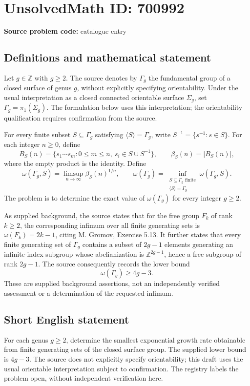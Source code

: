 \documentclass[11pt]{article}
\newcommand{\Z}{\mathbb{Z}}
\begin{document}
\section*{UnsolvedMath ID: 700992}
\textbf{Source problem code:} catalogue entry
\subsection{Definitions and mathematical statement}
Let \(g\in\Z\) with \(g\geq 2\). The source denotes by \(\Gamma_g\) the fundamental group of a closed surface of genus \(g\), without explicitly specifying orientability. Under the usual interpretation as a closed connected orientable surface \(\Sigma_g\), set \(\Gamma_g=\pi_1(\Sigma_g)\). The formulation below uses this interpretation; the orientability qualification requires confirmation from the source.

For every finite subset \(S\subseteq\Gamma_g\) satisfying \(\langle S\rangle=\Gamma_g\), write \(S^{-1}=\{s^{-1}:s\in S\}\). For each integer \(n\geq 0\), define
\[
 B_S(n)=\{s_1\cdots s_m:0\leq m\leq n,\ s_i\in S\cup S^{-1}\},
 \qquad \beta_S(n)=|B_S(n)|,
\]
where the empty product is the identity. Define
\[
 \omega(\Gamma_g,S)=\limsup_{n\to\infty}\beta_S(n)^{1/n},
 \qquad
 \omega(\Gamma_g)=\inf_{\substack{S\subseteq\Gamma_g\text{ finite}\\\langle S\rangle=\Gamma_g}}\omega(\Gamma_g,S).
\]
The problem is to determine the exact value of \(\omega(\Gamma_g)\) for every integer \(g\geq 2\).

As supplied background, the source states that for the free group \(F_k\) of rank \(k\geq 2\), the corresponding infimum over all finite generating sets is \(\omega(F_k)=2k-1\), citing M. Gromov, Exercise 5.13. It further states that every finite generating set of \(\Gamma_g\) contains a subset of \(2g-1\) elements generating an infinite-index subgroup whose abelianization is \(\Z^{2g-1}\), hence a free subgroup of rank \(2g-1\). The source consequently records the lower bound
\[
 \omega(\Gamma_g)\geq 4g-3.
\]
These are supplied background assertions, not an independently verified assessment or a determination of the requested infimum.
\subsection{Short English statement}
For each genus \(g\geq 2\), determine the smallest exponential growth rate obtainable from finite generating sets of the closed surface group. The supplied lower bound is \(4g-3\). The source does not explicitly specify orientability; this draft uses the usual orientable interpretation subject to confirmation. The registry labels the problem open, without independent verification here.
\end{document}
